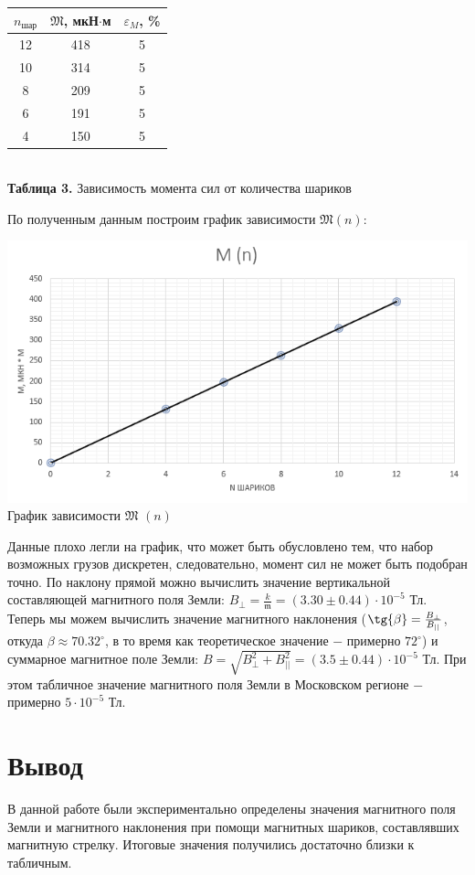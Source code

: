 \documentclass[a4paper,12pt]{article} %
\begin{document}
\begin{center}
    \begin{tabular}{|c|c|c|}\hline
    $n_{\text{шар}}$ & $\mathfrak{M}$, мкН$\cdot$м & $\varepsilon_M$, \% \\ \hline 
        12 & 418 & 5 \\ \hline
        10 & 314 & 5 \\ \hline
        8  & 209 & 5 \\ \hline
        6  & 191 & 5 \\ \hline
        4  & 150 & 5 \\ \hline
\end{tabular}\\
\hfill \break \textbf {Таблица 3.} Зависимость момента сил от количества шариков~\\
\end{center}

\hfill \break По полученным данным построим график зависимости $\mathfrak{M} (n)$:

\begin{center}
\includegraphics[width=0.95\linewidth]{3.1.3_7.png}\\
График зависимости $\mathfrak{M}$ $(n)$\\
\end{center}

\hfill \break Данные плохо легли на график, что может быть обусловлено тем, что набор возможных грузов дискретен, следовательно, момент сил не может быть подобран точно. По наклону прямой можно вычислить значение вертикальной составляющей магнитного поля Земли: $B_{\perp} = \frac{k}{\mathfrak{m}} = (3.30 \pm 0.44) \cdot 10^{-5}$ Тл. Теперь мы можем вычислить значение магнитного наклонения ($\tg{\beta} = \frac {B_{\perp}}{B_{||}}$, откуда $\beta \approx 70.32^{\circ}$, в то время как теоретическое значение $-$ примерно $72^{\circ}$) и суммарное магнитное поле Земли: $B = \sqrt{B_{\perp}^2 + B_{||}^2} = (3.5 \pm 0.44) \cdot 10^{-5}$ Тл. При этом табличное значение магнитного поля Земли в Московском регионе $-$ примерно $5 \cdot 10^{-5}$ Тл.

\section{Вывод}

\hfill \break В данной работе были экспериментально определены значения магнитного поля Земли и магнитного наклонения при помощи магнитных шариков, составлявших магнитную стрелку. Итоговые значения получились достаточно близки к табличным.
\end{document}
